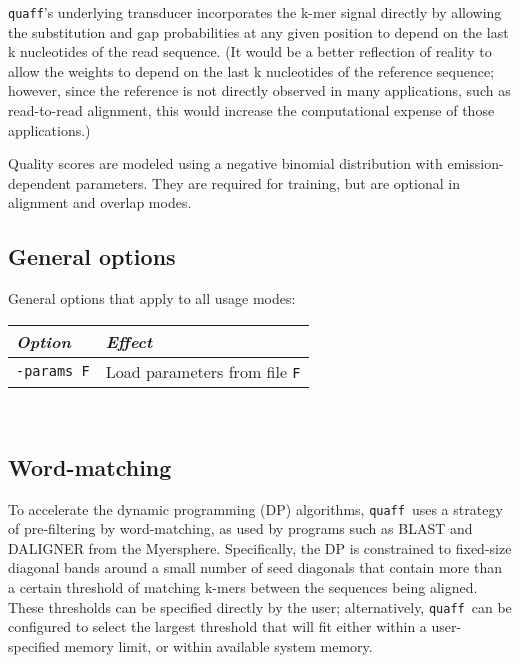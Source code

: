 \documentclass{article}
\newcommand\quaff{{\tt quaff}}
\newcommand\opt[1]{{\tt -#1}}
\newcommand\opttable[1]{\begin{tabular}[l]{ll} \hline {\em Option} & {\em Effect} \\ #1 \hline \end{tabular} \\}
\newcommand\optdesc[2]{\hline \opt{#1} & \parbox{.8\linewidth}{#2} \\ }
\begin{document}
\quaff's underlying transducer incorporates the k-mer signal directly by allowing the substitution and gap probabilities at any given position to depend on the last k nucleotides of the read sequence. (It would be a better reflection of reality to allow the weights to depend on the last k nucleotides of the reference sequence; however, since the reference is not directly observed in many applications, such as read-to-read alignment, this would increase the computational expense of those applications.)

Quality scores are modeled using a negative binomial distribution with emission-dependent parameters. They are required for training, but are optional in alignment and overlap modes.


\subsection{General options}

General options that apply to all usage modes:

\opttable{
  \optdesc{params F}{Load parameters from file {\tt F}}
  \optdesc{ref F}{Load reference sequences from file {\tt F}, which may be in FASTA, FASTQ, or zipped/gzipped versions of those formats. (Quality scores in FASTQ files will be ignored for reference sequences.) You can specify more than one reference sequence file.}
  \optdesc{read F}{Load reads from file {\tt F}, which may be in FASTA, FASTQ, or zipped/gzipped versions of those formats. You can specify more than one reference sequence file.}
  \optdesc{fwdstrand}{The default behavior is to consider each reference sequence twice: once as loaded, once reverse-complemented. This option turns off the reverse complement.}
  \optdesc{global}{The default behavior is to do alignment that is global in the read, local in the reference sequence. This option makes it global in both.}
  \optdesc{null F}{Load a null model from file F (default is to compute it automatically from the read sequences)}
  \optdesc{savenull F}{After computing the null model, or loading it, save it to file F}
}


\subsection{Word-matching}

To accelerate the dynamic programming (DP) algorithms, \quaff\ uses a strategy of pre-filtering by word-matching, as used by programs such as BLAST and DALIGNER from the Myersphere. Specifically, the DP is constrained to fixed-size diagonal bands around a small number of seed diagonals that contain more than a certain threshold of matching k-mers between the sequences being aligned. These thresholds can be specified directly by the user; alternatively, \quaff\ can be configured to select the largest threshold that will fit either within a user-specified memory limit, or within available system memory.
\end{document}
